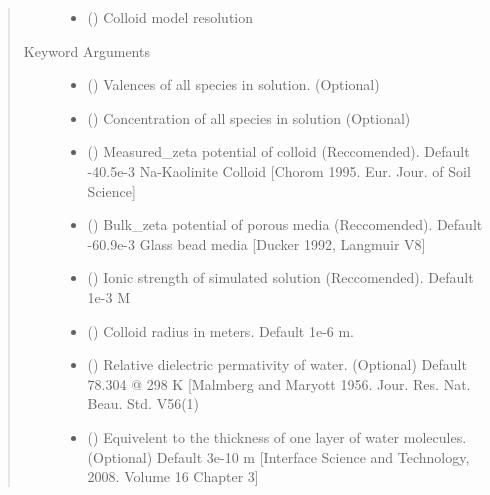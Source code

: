 \documentclass[letterpaper,10pt,english]{sphinxmanual}
\begin{document}
\begin{fulllineitems}
\begin{quote}
\begin{description}
\begin{itemize}
\item {} 
 () \textendash{} Colloid model resolution

\end{itemize}

\item[{Keyword Arguments}] \leavevmode\begin{itemize}
\item {} 
 () \textendash{} Valences of all species in solution. (Optional)

\item {} 
 () \textendash{} Concentration of all species in solution (Optional)

\item {} 
 () \textendash{} Measured\_zeta potential of colloid (Reccomended).
Default -40.5e-3 Na-Kaolinite Colloid {[}Chorom 1995. Eur. Jour. of Soil Science{]}

\item {} 
 () \textendash{} Bulk\_zeta potential of porous media (Reccomended).
Default -60.9e-3 Glass bead media {[}Ducker 1992, Langmuir V8{]}

\item {} 
 () \textendash{} Ionic strength of simulated solution (Reccomended). Default 1e-3 M

\item {} 
 () \textendash{} Colloid radius in meters. Default 1e-6 m.

\item {} 
 () \textendash{} Relative dielectric permativity of water. (Optional)
Default 78.304 @ 298 K {[}Malmberg and Maryott 1956. Jour. Res. Nat. Beau. Std. V56(1)

\item {} 
 () \textendash{} Equivelent to the thickness of one layer of water molecules. (Optional)
Default 3e-10 m {[}Interface Science and Technology, 2008. Volume 16 Chapter 3{]}


\end{itemize}
\end{description}
\end{quote}
\end{fulllineitems}
\end{document}
